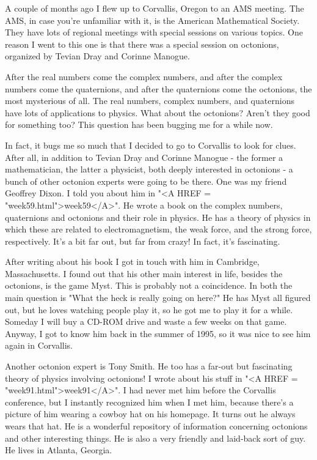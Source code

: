 

A couple of months ago I flew up to Corvallis, Oregon to an AMS
meeting.  The AMS, in case you're unfamiliar with it, is the American
Mathematical Society.  They have lots of regional meetings with special
sessions on various topics.  One reason I went to this one is that there
was a special session on octonions, organized by Tevian Dray and Corinne
Manogue.  

After the real numbers come the complex numbers, and after the complex
numbers come the quaternions, and after the quaternions come the
octonions, the most mysterious of all.  The real numbers, complex
numbers, and quaternions have lots of applications to physics.  What
about the octonions?  Aren't they good for something too?  This
question has been bugging me for a while now.  

In fact, it bugs me so much that I decided to go to Corvallis to look
for clues.  After all, in addition to Tevian Dray and Corinne Manogue -
the former a mathematician, the latter a physicist, both deeply
interested in octonions - a bunch of other octonion experts were going
to be there.  One was my friend Geoffrey Dixon.  I told you about him in
"<A HREF = "week59.html">week59</A>".  He wrote a book on the complex numbers, quaternions and
octonions and their role in physics.  He has a theory of physics in
which these are related to electromagnetism, the weak force, and the
strong force, respectively.  It's a bit far out, but far from crazy!
In fact, it's fascinating.

After writing about his book I got in touch with him in Cambridge,
Massachusetts.  I found out that his other main interest in life,
besides the octonions, is the game Myst.  This is probably not a
coincidence.  In both the main question is "What the heck is really
going on here?"  He has Myst all figured out, but he loves watching
people play it, so he got me to play it for a while.  Someday I will buy
a CD-ROM drive and waste a few weeks on that game.  Anyway, I got to
know him back in the summer of 1995, so it was nice to see him again in
Corvallis.

Another octonion expert is Tony Smith.  He too has a far-out but
fascinating theory of physics involving octonions!  I wrote about his
stuff in "<A HREF = "week91.html">week91</A>".  I had never met him before the Corvallis conference,
but I instantly recognized him when I met him, because there's a picture
of him wearing a cowboy hat on his homepage.  It turns out he always
wears that hat.  He is a wonderful repository of information concerning
octonions and other interesting things.  He is also a very friendly and
laid-back sort of guy.  He lives in Atlanta, Georgia.  

